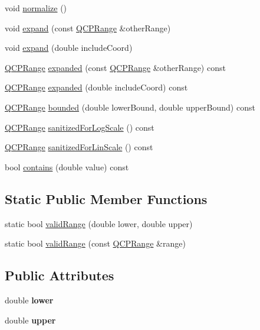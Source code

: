 \begin{DoxyCompactItemize}
void \hyperlink{class_q_c_p_range_af914a7740269b0604d0827c634a878a9}{normalize} ()
\item 
void \hyperlink{class_q_c_p_range_a0fa1bc8048be50d52bea93a8caf08305}{expand} (const \hyperlink{class_q_c_p_range}{Q\+C\+P\+Range} \&other\+Range)
\item 
void \hyperlink{class_q_c_p_range_a5fa977db0a4b7800075c629c62cf5e80}{expand} (double include\+Coord)
\item 
\hyperlink{class_q_c_p_range}{Q\+C\+P\+Range} \hyperlink{class_q_c_p_range_a9cbfb7cd06eac1839cae981e05c19633}{expanded} (const \hyperlink{class_q_c_p_range}{Q\+C\+P\+Range} \&other\+Range) const
\item 
\hyperlink{class_q_c_p_range}{Q\+C\+P\+Range} \hyperlink{class_q_c_p_range_af81d70f1add7233d73a19dcbe5decb2e}{expanded} (double include\+Coord) const
\item 
\hyperlink{class_q_c_p_range}{Q\+C\+P\+Range} \hyperlink{class_q_c_p_range_a22151e18d961d762d25721211e89c2e5}{bounded} (double lower\+Bound, double upper\+Bound) const
\item 
\hyperlink{class_q_c_p_range}{Q\+C\+P\+Range} \hyperlink{class_q_c_p_range_a3d66288d66e1d6df3636075eb42502ee}{sanitized\+For\+Log\+Scale} () const
\item 
\hyperlink{class_q_c_p_range}{Q\+C\+P\+Range} \hyperlink{class_q_c_p_range_a808751fdd9b17ef52327ba011df2e5f1}{sanitized\+For\+Lin\+Scale} () const
\item 
bool \hyperlink{class_q_c_p_range_ae9842b48b6d38dc5e9607358e3083cc8}{contains} (double value) const
\end{DoxyCompactItemize}
\subsection*{Static Public Member Functions}
\begin{DoxyCompactItemize}
\item 
static bool \hyperlink{class_q_c_p_range_ab38bd4841c77c7bb86c9eea0f142dcc0}{valid\+Range} (double lower, double upper)
\item 
static bool \hyperlink{class_q_c_p_range_a801b964752eaad6219be9d8a651ec2b3}{valid\+Range} (const \hyperlink{class_q_c_p_range}{Q\+C\+P\+Range} \&range)
\end{DoxyCompactItemize}
\subsection*{Public Attributes}
\begin{DoxyCompactItemize}
\item 
\mbox{\label{class_q_c_p_range_aa3aca3edb14f7ca0c85d912647b91745}} 
double {\bfseries lower}
\item 
\mbox{\label{class_q_c_p_range_ae44eb3aafe1d0e2ed34b499b6d2e074f}} 
double {\bfseries upper}
\end{DoxyCompactItemize}
